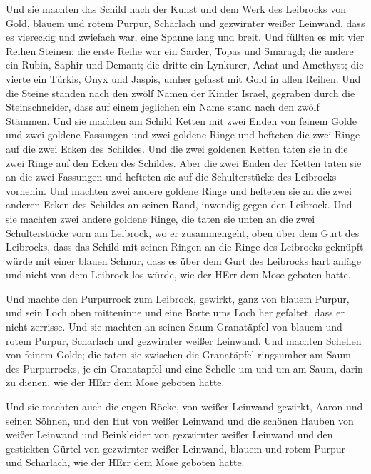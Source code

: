  Und sie machten das Schild nach der Kunst und dem Werk des
Leibrocks von Gold, blauem und rotem Purpur, Scharlach und gezwirnter
weißer Leinwand,  dass es viereckig und zwiefach war, eine
Spanne lang und breit.  Und füllten es mit vier Reihen
Steinen: die erste Reihe war ein Sarder, Topas und Smaragd;
 die andere ein Rubin, Saphir und Demant;  die
dritte ein Lynkurer, Achat und Amethyst;  die vierte ein
Türkis, Onyx und Jaspis, umher gefasst mit Gold in allen Reihen.
 Und die Steine standen nach den zwölf Namen der Kinder
Israel, gegraben durch die Steinschneider, dass auf einem jeglichen ein
Name stand nach den zwölf Stämmen.  Und sie machten am
Schild Ketten mit zwei Enden von feinem Golde  und zwei
goldene Fassungen und zwei goldene Ringe und hefteten die zwei Ringe auf
die zwei Ecken des Schildes.  Und die zwei goldenen Ketten
taten sie in die zwei Ringe auf den Ecken des Schildes. 
Aber die zwei Enden der Ketten taten sie an die zwei Fassungen und
hefteten sie auf die Schulterstücke des Leibrocks vornehin.
 Und machten zwei andere goldene Ringe und hefteten sie an
die zwei anderen Ecken des Schildes an seinen Rand, inwendig gegen den
Leibrock.  Und sie machten zwei andere goldene Ringe, die
taten sie unten an die zwei Schulterstücke vorn am Leibrock, wo er
zusammengeht, oben über dem Gurt des Leibrocks,  dass das
Schild mit seinen Ringen an die Ringe des Leibrocks geknüpft würde mit
einer blauen Schnur, dass es über dem Gurt des Leibrocks hart anläge und
nicht von dem Leibrock los würde, wie der HErr dem Mose geboten hatte.

 Und machte den Purpurrock zum Leibrock, gewirkt, ganz von
blauem Purpur,  und sein Loch oben mitteninne und eine
Borte ums Loch her gefaltet, dass er nicht zerrisse.  Und
sie machten an seinen Saum Granatäpfel von blauem und rotem Purpur,
Scharlach und gezwirnter weißer Leinwand.  Und machten
Schellen von feinem Golde; die taten sie zwischen die Granatäpfel
ringsumher am Saum des Purpurrocks,  je ein Granatapfel und
eine Schelle um und um am Saum, darin zu dienen, wie der HErr dem Mose
geboten hatte.

 Und sie machten auch die engen Röcke, von weißer Leinwand
gewirkt, Aaron und seinen Söhnen,  und den Hut von weißer
Leinwand und die schönen Hauben von weißer Leinwand und Beinkleider von
gezwirnter weißer Leinwand  und den gestickten Gürtel von
gezwirnter weißer Leinwand, blauem und rotem Purpur und Scharlach, wie
der HErr dem Mose geboten hatte.

